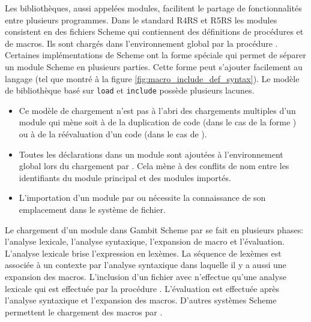 Les bibliothèques, aussi appelées modules, facilitent le partage de
fonctionnalités entre plusieurs programmes. Dans le standard
R4RS\cite{Scheme:R4RS} et R5RS\cite{Scheme:R5RS} les modules consistent en des
fichiers Scheme qui contiennent des définitions de procédures et de macros. Ils
sont chargés dans l'environnement global par la procédure . Certaines
implémentations de Scheme ont la forme spéciale  qui permet de
séparer un module Scheme en plusieurs parties. Cette forme peut s'ajouter
facilement au langage (tel que montré à la figure
\ref{fig:macro_include_def_syntax}).  Le modèle de bibliothèque basé sur
\texttt{load} et \texttt{include} possède plusieurs lacunes.

\begin{itemize}
  \item Ce modèle de chargement n'est pas à l'abri des chargements multiples
    d'un module qui mène soit à de la duplication de code (dans le cas de la forme )
    ou à de la réévaluation d'un code (dans le cas de ).

  \item Toutes les déclarations dans un module sont ajoutées à l'environnement
    global lors du chargement par . Cela mène à des conflits de
    nom entre les identifiants du module principal et des modules importés.

  \item L'importation d'un module par  ou  nécessite la connaissance
    de son emplacement dans le système de fichier.

\end{itemize}


Le chargement d'un module dans Gambit Scheme par  se fait en plusieurs
phases: l'analyse lexicale, l'analyse syntaxique, l'expansion de macro et
l'évaluation. L'analyse lexicale brise l'expression en lexèmes. La séquence de
lexèmes est associée à un contexte par l'analyse syntaxique dans laquelle il y a aussi
une expansion des macros. L'inclusion d'un fichier avec  n'effectue qu'une
analyse lexicale qui est effectuée par la procédure . L'évaluation
est effectuée après l'analyse syntaxique et l'expansion des macros. D'autres systèmes
Scheme permettent le chargement des macros par .

